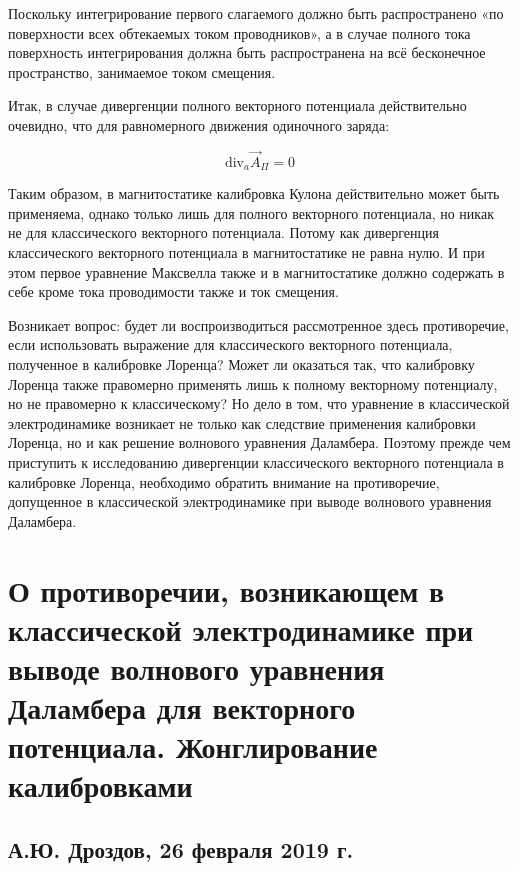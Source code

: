 \documentclass[12pt, a4paper]{article}
\begin{document}
Поскольку интегрирование первого слагаемого должно быть распространено «по поверхности всех обтекаемых током проводников», а в случае полного тока поверхность интегрирования должна быть распространена на всё бесконечное пространство, занимаемое током смещения.

Итак, в случае дивергенции полного векторного потенциала действительно очевидно, что для равномерного движения одиночного заряда:

\begin{equation}
\text{div}_a \vec{A}_{\Pi} = 0
\label{eq:div_A_total_zero}
\end{equation}

Таким образом, в магнитостатике калибровка Кулона действительно может быть применяема, однако только лишь для полного векторного потенциала, но никак не для классического векторного потенциала. Потому как дивергенция классического векторного потенциала в магнитостатике не равна нулю. И при этом первое уравнение Максвелла также и в магнитостатике должно содержать в себе кроме тока проводимости также и ток смещения.

Возникает вопрос: будет ли воспроизводиться рассмотренное здесь противоречие, если использовать выражение для классического векторного потенциала, полученное в калибровке Лоренца? Может ли оказаться так, что калибровку Лоренца также правомерно применять лишь к полному векторному потенциалу, но не правомерно к классическому? Но дело в том, что уравнение в классической электродинамике возникает не только как следствие применения калибровки Лоренца, но и как решение волнового уравнения Даламбера. Поэтому прежде чем приступить к исследованию дивергенции классического векторного потенциала в калибровке Лоренца, необходимо обратить внимание на противоречие, допущенное в классической электродинамике при выводе волнового уравнения Даламбера.

\section{О противоречии, возникающем в классической электродинамике при выводе волнового уравнения Даламбера для векторного потенциала. Жонглирование калибровками}
\label{sec:work02}

\subsection*{А.Ю. Дроздов, 26 февраля 2019 г.}
\end{document}
